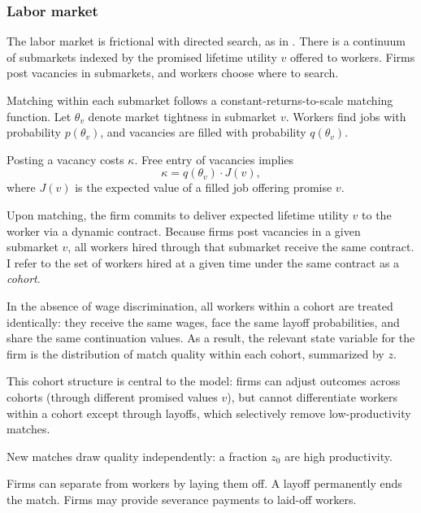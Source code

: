 \subsubsection*{Labor market}

The labor market is frictional with directed search, as in \textcite{moen1997}. There is a continuum of submarkets indexed by the promised lifetime utility $v$ offered to workers. Firms post vacancies in submarkets, and workers choose where to search.

Matching within each submarket follows a constant-returns-to-scale matching function. Let $\theta_v$ denote market tightness in submarket $v$. Workers find jobs with probability $p(\theta_v)$, and vacancies are filled with probability $q(\theta_v)$.

Posting a vacancy costs $\kappa$. Free entry of vacancies implies
\[
\kappa = q(\theta_v) \cdot J(v),
\]
where $J(v)$ is the expected value of a filled job offering promise $v$.

Upon matching, the firm commits to deliver expected lifetime utility $v$ to the worker via a dynamic contract. Because firms post vacancies in a given submarket $v$, all workers hired through that submarket receive the same contract. I refer to the set of workers hired at a given time under the same contract as a \emph{cohort}.

In the absence of wage discrimination, all workers within a cohort are treated identically: they receive the same wages, face the same layoff probabilities, and share the same continuation values. As a result, the relevant state variable for the firm is the distribution of match quality within each cohort, summarized by $z$.

This cohort structure is central to the model: firms can adjust outcomes across cohorts (through different promised values $v$), but cannot differentiate workers within a cohort except through layoffs, which selectively remove low-productivity matches.

New matches draw quality independently: a fraction $z_0$ are high productivity.

Firms can separate from workers by laying them off. A layoff permanently ends the match. Firms may provide severance payments to laid-off workers.

